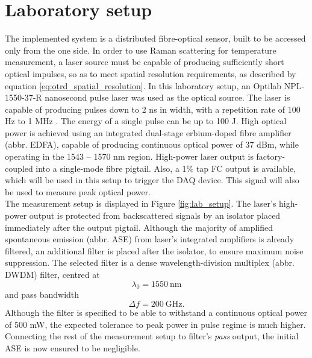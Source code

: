\documentclass{standalone}
\begin{document}
\chapter{Laboratory setup} \label{ch:setup}
\setcounter{page}\thestranica


The implemented system is a distributed fibre-optical sensor, built to be accessed only from the one side. In order to use Raman scattering for temperature measurement, a laser source must be capable of producing sufficiently short optical impulses, so as to meet spatial resolution requirements, as described by equation \ref{eq:otrd_spatial_resolution}. In this laboratory setup, an Optilab NPL-1550-37-R nanosecond pulse laser was used as the optical source. The laser is capable of producing pulses down to 2 ns in width, with a repetition rate of 100 Hz to 1 MHz \cite{datasheet:laser}. The energy of a single pulse can be up to 100 \textmu J. High optical power is achieved using an integrated dual-stage erbium-doped fibre amplifier (abbr. EDFA), capable of producing continuous optical power of 37 dBm, while operating in the 1543 -- 1570 nm region. High-power laser output is factory-coupled into a single-mode fibre pigtail. Also, a 1\% tap FC output is available, which will be used in this setup to trigger the DAQ device. This signal will also be used to measure peak optical power. \\

The measurement setup is displayed in Figure \ref{fig:lab_setup}.
The laser's high-power output is protected from backscattered signals by an isolator placed immediately after the output pigtail. Although the majority of amplified spontaneous emission (abbr. ASE) from laser's integrated amplifiers is already filtered, an additional filter is placed after the isolator, to ensure maximum noise suppression. The selected filter is a dense wavelength-division multiplex (abbr. DWDM) filter, centred at \cite{datasheet:dwdm_filter}
\begin{equation} \label{eq:dwdm_filter_centre}
\lambda_0 = \SI{1550}{\nano \meter}
\end{equation} and pass bandwidth 
\begin{equation} \label{eq:dwdm_filter_bw}
\varDelta f = \SI{200}{\giga \hertz} \textrm{.}
\end{equation}
Although the filter is specified to be able to withstand a continuous optical power of 500 mW, the expected tolerance to peak power in pulse regime is much higher. Connecting the rest of the measurement setup to filter's \textit{pass} output, the initial ASE is now ensured to be negligible. \\
\end{document}
